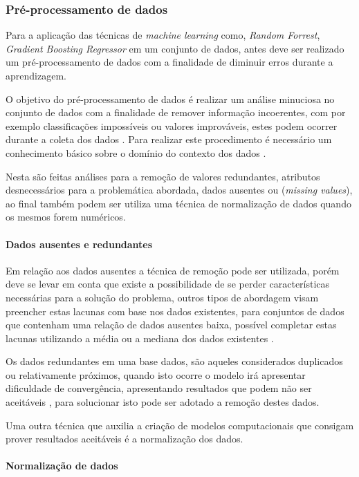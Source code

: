 \documentclass[
12pt,				%
oneside,			%
a4paper,			%
english,			%
french,				%
spanish,			%
brazil				%
]{abntex2}
\begin{document}
\subsubsection{Pré-processamento de dados}

Para a aplicação das técnicas de \textit{machine learning} como, \textit{Random Forrest}, \textit{Gradient Boosting Regressor} em um conjunto de dados, antes deve ser realizado um  pré-processamento de dados com a finalidade de diminuir erros durante a aprendizagem.

O objetivo do pré-processamento de dados é realizar um análise minuciosa no conjunto de dados com a finalidade de remover informação incoerentes, com por exemplo classificações impossíveis ou valores improváveis, estes podem ocorrer durante a coleta dos dados \cite{garcia2015data}. Para realizar este procedimento é necessário um conhecimento básico sobre o domínio do contexto dos dados .  

Nesta são feitas análises para a remoção de valores redundantes, atributos desnecessários para a problemática abordada,  dados ausentes ou (\textit{missing values}), ao final também podem ser utiliza uma técnica de normalização de dados quando os mesmos forem numéricos. 

\paragraph{Dados ausentes e redundantes}

Em relação  aos dados ausentes a técnica de remoção pode ser utilizada, porém deve se levar em conta que existe a possibilidade de se perder características necessárias para a solução do problema, outros tipos de abordagem visam preencher estas lacunas com base nos dados existentes, para conjuntos de dados que contenham uma relação de dados ausentes baixa, possível completar estas lacunas utilizando a média ou a mediana dos dados existentes \cite{padilha2017mineracao}.  

Os dados redundantes em uma base dados, são aqueles considerados duplicados ou relativamente próximos, quando isto ocorre o modelo irá apresentar dificuldade de convergência, apresentando resultados que podem não ser aceitáveis \cite{padilha2017mineracao}, para solucionar isto pode ser adotado a remoção destes dados.

Uma outra técnica que auxilia a criação de modelos computacionais que consigam prover resultados aceitáveis é a normalização dos dados.

\paragraph{Normalização de dados}
\end{document}
